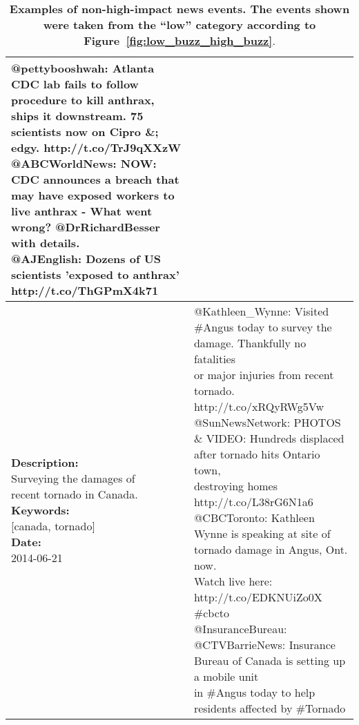 \begin{table}
{\begin{tabular*}{1\linewidth}{p{5cm}p{5cm}}
{        @pettybooshwah: Atlanta CDC lab fails to follow procedure to kill anthrax,\\ ships it downstream. 75 scientists now on Cipro \&; edgy. http://t.co/TrJ9qXXzW\vspace{.1cm}\\
        @ABCWorldNews: NOW: CDC announces a breach that may have exposed workers to\\ live anthrax - What went wrong? @DrRichardBesser with details.\vspace{.1cm}\\
        @AJEnglish: Dozens of US scientists 'exposed to anthrax' http://t.co/ThGPmX4k71
      }
      \\
      \hline
      \pbox{20cm}{\textbf{Description:}\\Surveying the damages of \\ recent tornado in Canada. \vspace{.1cm}\\
        \textbf{Keywords:}\\ {[}canada, tornado{]}\vspace{.1cm}\\
        \textbf{Date:}\\ 2014-06-21}
      & \pbox{20cm}{
        @Kathleen\_Wynne: Visited \#Angus today to survey the damage. Thankfully no fatalities\\ or major injuries from recent tornado. http://t.co/xRQyRWg5Vw\vspace{.1cm}\\
        @SunNewsNetwork: PHOTOS \& VIDEO: Hundreds displaced after tornado hits Ontario town,\\ destroying homes http://t.co/L38rG6N1a6\vspace{.1cm}\\
        @CBCToronto: Kathleen Wynne is speaking at site of tornado damage in Angus, Ont. now.\\ Watch live here: http://t.co/EDKNUiZo0X \#cbcto\vspace{.1cm}\\
        @InsuranceBureau: @CTVBarrieNews: Insurance Bureau of Canada is setting up a mobile unit\\ in \#Angus today to help residents affected by \#Tornado}
      \\
      \hline
    \end{tabular*}
  }
  \caption{\textbf{Examples of non-high-impact news events. The events
      shown were taken from the ``low'' category according to Figure~\ref{fig:low_buzz_high_buzz}}.}
  \label{table:low-impact-sample}
\end{table}
%

